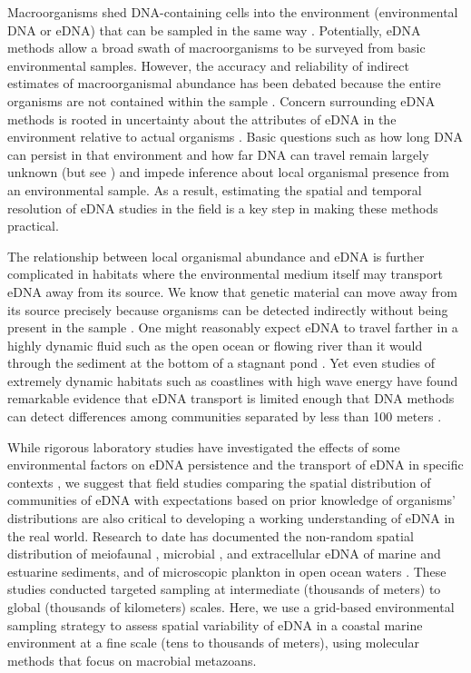 \documentclass[11pt,letterpaper]{article} %
\begin{document}
Macroorganisms shed DNA-containing cells into the environment (environmental DNA or eDNA) that can be sampled in the same way  \citep{Ficetola2008,Thomsen2012}. Potentially, eDNA methods allow a broad swath of macroorganisms to be surveyed from basic environmental samples. However, the accuracy and reliability of indirect estimates of macroorganismal abundance has been debated because the entire organisms are not contained within the sample \citep{Cowart2015}. Concern surrounding eDNA methods is rooted in uncertainty about the attributes of eDNA in the environment relative to actual organisms \citep{Shelton2016, Evans2016}. Basic questions such as how long DNA can persist in that environment and how far DNA can travel remain largely unknown (but see \cite{Klymus2015,Turner2015,Strickler2015,Deiner2014}) and impede inference about local organismal presence from an environmental sample. As a result, estimating the spatial and temporal resolution of eDNA studies in the field is a key step in making these methods practical.


The relationship between local organismal abundance and eDNA is further complicated in habitats where the environmental medium itself may transport eDNA away from its source. We know that genetic material can move away from its source precisely because organisms can be detected indirectly without being present in the sample \citep{Kelly2016}. One might reasonably expect eDNA to travel farther in a highly dynamic fluid such as the open ocean or flowing river than it would through the sediment at the bottom of a stagnant pond \citep{Deiner2014, Shogren2016}. Yet even studies of extremely dynamic habitats such as coastlines with high wave energy have found remarkable evidence that eDNA transport is limited enough that DNA methods can detect differences among communities separated by less than 100 meters \citep{Port2016}.


While rigorous laboratory studies have investigated the effects of some environmental factors on eDNA persistence \citep{Klymus2015, Barnes2014, Sassoubre2016} and the transport of eDNA in specific contexts \citep{Deiner2014}, we suggest that field studies comparing the spatial distribution of communities of eDNA with expectations based on prior knowledge of organisms' distributions are also critical to developing a working understanding of eDNA in the real world.
Research to date has documented the non-random spatial distribution of %
meiofaunal \citep{Fonseca2014,Guardiola2016}, microbial \citep{Lallias2015},
and extracellular \citep{Guardiola2015} eDNA of marine and estuarine sediments, and of microscopic plankton in open ocean waters \citep{DeVargas2015}.
These studies conducted targeted sampling at intermediate (thousands of meters) to global (thousands of kilometers) scales.
Here, we use a grid-based environmental sampling strategy to assess spatial variability of eDNA in a coastal marine environment at a fine scale (tens to thousands of meters), using molecular methods that focus on macrobial metazoans.
\end{document}
